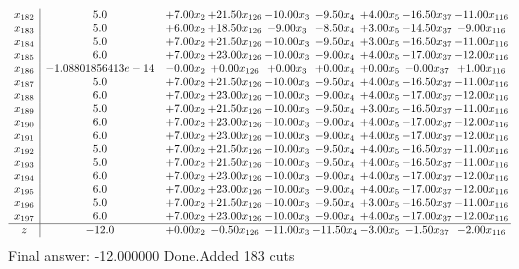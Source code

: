 \documentclass[8pt]{article}
\begin{document}
\[\begin{array}{c| c c@{\hskip 2pt} c@{\hskip 2pt} c@{\hskip 2pt} c@{\hskip 2pt} c@{\hskip 2pt} c@{\hskip 2pt} c@{\hskip 2pt} }
 x_{182}   &  5.0 & +  7.00 x_{2} & + 21.50 x_{126} & -10.00 x_{3} & -9.50 x_{4} & +  4.00 x_{5} & -16.50 x_{37} & -11.00 x_{116}\\
 x_{183}   &  5.0 & +  6.00 x_{2} & + 18.50 x_{126} & -9.00 x_{3} & -8.50 x_{4} & +  3.00 x_{5} & -14.50 x_{37} & -9.00 x_{116}\\
 x_{184}   &  5.0 & +  7.00 x_{2} & + 21.50 x_{126} & -10.00 x_{3} & -9.50 x_{4} & +  3.00 x_{5} & -16.50 x_{37} & -11.00 x_{116}\\
 x_{185}   &  6.0 & +  7.00 x_{2} & + 23.00 x_{126} & -10.00 x_{3} & -9.00 x_{4} & +  4.00 x_{5} & -17.00 x_{37} & -12.00 x_{116}\\
 x_{186}   &  -1.08801856413e-14 & -0.00 x_{2} & +  0.00 x_{126} & +  0.00 x_{3} & +  0.00 x_{4} & +  0.00 x_{5} & -0.00 x_{37} & +  1.00 x_{116}\\
 x_{187}   &  5.0 & +  7.00 x_{2} & + 21.50 x_{126} & -10.00 x_{3} & -9.50 x_{4} & +  4.00 x_{5} & -16.50 x_{37} & -11.00 x_{116}\\
 x_{188}   &  6.0 & +  7.00 x_{2} & + 23.00 x_{126} & -10.00 x_{3} & -9.00 x_{4} & +  4.00 x_{5} & -17.00 x_{37} & -12.00 x_{116}\\
 x_{189}   &  5.0 & +  7.00 x_{2} & + 21.50 x_{126} & -10.00 x_{3} & -9.50 x_{4} & +  3.00 x_{5} & -16.50 x_{37} & -11.00 x_{116}\\
 x_{190}   &  6.0 & +  7.00 x_{2} & + 23.00 x_{126} & -10.00 x_{3} & -9.00 x_{4} & +  4.00 x_{5} & -17.00 x_{37} & -12.00 x_{116}\\
 x_{191}   &  6.0 & +  7.00 x_{2} & + 23.00 x_{126} & -10.00 x_{3} & -9.00 x_{4} & +  4.00 x_{5} & -17.00 x_{37} & -12.00 x_{116}\\
 x_{192}   &  5.0 & +  7.00 x_{2} & + 21.50 x_{126} & -10.00 x_{3} & -9.50 x_{4} & +  4.00 x_{5} & -16.50 x_{37} & -11.00 x_{116}\\
 x_{193}   &  5.0 & +  7.00 x_{2} & + 21.50 x_{126} & -10.00 x_{3} & -9.50 x_{4} & +  4.00 x_{5} & -16.50 x_{37} & -11.00 x_{116}\\
 x_{194}   &  6.0 & +  7.00 x_{2} & + 23.00 x_{126} & -10.00 x_{3} & -9.00 x_{4} & +  4.00 x_{5} & -17.00 x_{37} & -12.00 x_{116}\\
 x_{195}   &  6.0 & +  7.00 x_{2} & + 23.00 x_{126} & -10.00 x_{3} & -9.00 x_{4} & +  4.00 x_{5} & -17.00 x_{37} & -12.00 x_{116}\\
 x_{196}   &  5.0 & +  7.00 x_{2} & + 21.50 x_{126} & -10.00 x_{3} & -9.50 x_{4} & +  3.00 x_{5} & -16.50 x_{37} & -11.00 x_{116}\\
 x_{197}   &  6.0 & +  7.00 x_{2} & + 23.00 x_{126} & -10.00 x_{3} & -9.00 x_{4} & +  4.00 x_{5} & -17.00 x_{37} & -12.00 x_{116}\\
\hline
z    &  -12.0 & +  0.00 x_{2} & -0.50 x_{126} & -11.00 x_{3} & -11.50 x_{4} & -3.00 x_{5} & -1.50 x_{37} & -2.00 x_{116}\\
\end{array}\]
 Final answer: -12.000000 
Done.Added 183 cuts 
\end{document}
